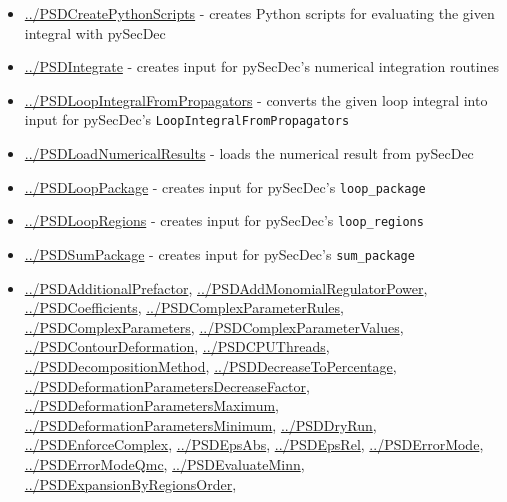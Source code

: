\documentclass[../FeynHelpersManual.tex]{subfiles}
\begin{document}
\begin{itemize}
\tightlist
\item
  \hyperlink{../psdcreatepythonscripts}{../PSDCreatePythonScripts} -
  creates Python scripts for evaluating the given integral with pySecDec
\item
  \hyperlink{../psdintegrate}{../PSDIntegrate} - creates input for
  pySecDec's numerical integration routines
\item
  \hyperlink{../psdloopintegralfrompropagators}{../PSDLoopIntegralFromPropagators}
  - converts the given loop integral into input for pySecDec's
  \texttt{LoopIntegralFromPropagators}
\item
  \hyperlink{../psdloadnumericalresults}{../PSDLoadNumericalResults} -
  loads the numerical result from pySecDec
\item
  \hyperlink{../psdlooppackage}{../PSDLoopPackage} - creates input for
  pySecDec's \texttt{loop_package}
\item
  \hyperlink{../psdloopregions}{../PSDLoopRegions} - creates input for
  pySecDec's \texttt{loop_regions}
\item
  \hyperlink{../psdsumpackage}{../PSDSumPackage} - creates input for
  pySecDec's \texttt{sum_package}
\item
  \hyperlink{../psdadditionalprefactor}{../PSDAdditionalPrefactor},
  \hyperlink{../psdaddmonomialregulatorpower}{../PSDAddMonomialRegulatorPower},
  \hyperlink{../psdcoefficients}{../PSDCoefficients},
  \hyperlink{../psdcomplexparameterrules}{../PSDComplexParameterRules},
  \hyperlink{../psdcomplexparameters}{../PSDComplexParameters},
  \hyperlink{../psdcomplexparametervalues}{../PSDComplexParameterValues},
  \hyperlink{../psdcontourdeformation}{../PSDContourDeformation},
  \hyperlink{../psdcputhreads}{../PSDCPUThreads},
  \hyperlink{../psddecompositionmethod}{../PSDDecompositionMethod},
  \hyperlink{../psddecreasetopercentage}{../PSDDecreaseToPercentage},
  \hyperlink{../psddeformationparametersdecreasefactor}{../PSDDeformationParametersDecreaseFactor},
  \hyperlink{../psddeformationparametersmaximum}{../PSDDeformationParametersMaximum},
  \hyperlink{../psddeformationparametersminimum}{../PSDDeformationParametersMinimum},
  \hyperlink{../psddryrun}{../PSDDryRun},
  \hyperlink{../psdenforcecomplex}{../PSDEnforceComplex},
  \hyperlink{../psdepsabs}{../PSDEpsAbs},
  \hyperlink{../psdepsrel}{../PSDEpsRel},
  \hyperlink{../psderrormode}{../PSDErrorMode},
  \hyperlink{../psderrormodeqmc}{../PSDErrorModeQmc},
  \hyperlink{../psdevaluateminn}{../PSDEvaluateMinn},
  \hyperlink{../psdexpansionbyregionsorder}{../PSDExpansionByRegionsOrder},

\end{itemize}
\end{document}
